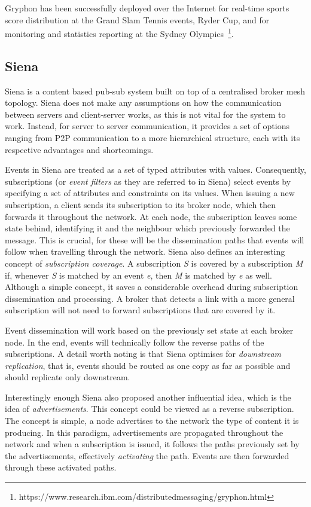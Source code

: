 Gryphon has been successfully deployed over the Internet for real-time
sports score distribution at the Grand Slam Tennis events, Ryder Cup,
and for monitoring and statistics reporting at the Sydney Olympics~\footnote{https://www.research.ibm.com/distributedmessaging/gryphon.html}.

\subsection{Siena}\label{siena}

Siena \cite{Carzaniga2003} is a content based pub-sub system built
on top of a centralised broker mesh topology. Siena does not make any
assumptions on how the communication between servers and client-server
works, as this is not vital for the system to work. Instead, for server
to server communication, it provides a set of options ranging from P2P
communication to a more hierarchical structure, each with its respective
advantages and shortcomings.

Events in Siena are treated as a set of typed attributes with values.
Consequently, subscriptions (or \emph{event filters} as they are
referred to in Siena) select events by specifying a set of attributes
and constraints on its values. When issuing a new subscription, a client
sends its subscription to its broker node, which then forwards it
throughout the network. At each node, the subscription leaves some state
behind, identifying it and the neighbour which previously forwarded the
message. This is crucial, for these will be the dissemination paths that
events will follow when travelling through the network. Siena also
defines an interesting concept of \emph{subscription coverage}. A
subscription \emph{S} is covered by a subscription \emph{M} if, whenever
\emph{S} is matched by an event \emph{e}, then \emph{M} is matched by
\emph{e} as well. Although a simple concept, it saves a considerable
overhead during subscription dissemination and processing. A broker that
detects a link with a more general subscription will not need to forward
subscriptions that are covered by it.

Event dissemination will work based on the previously set state at each
broker node. In the end, events will technically follow the reverse paths
of the subscriptions. A detail worth noting is that Siena optimises for
\emph{downstream replication}, that is, events should be routed as one
copy as far as possible and should replicate only downstream.

Interestingly enough Siena also proposed another influential idea, which
is the idea of \emph{advertisements}. This concept could be viewed as a
reverse subscription. The concept is simple, a node advertises to the
network the type of content it is producing. In this paradigm,
advertisements are propagated throughout the network and when a
subscription is issued, it follows the paths previously set by the
advertisements, effectively \emph{activating} the path. Events are then
forwarded through these activated paths.


